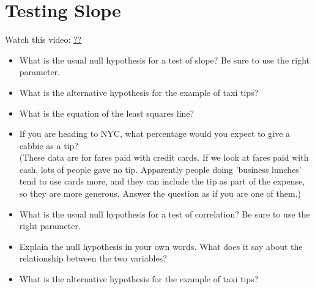 \def\theTopic{Reading 16}

\section{Testing Slope}

Watch this video:  \url{??}


\begin{itemize}
 \item What is the usual null hypothesis for a test of slope? Be sure
   to use the right parameter. \vspace{1.5cm}

 \item What is the alternative hypothesis for the example of taxi tips?\vspace{1.5cm}

 \item What is the equation of the least squares line?\vspace{1.5cm}

 \item If you are heading to NYC, what percentage would you expect to give a
   cabbie as a tip?\\
    (These data are for fares paid with credit cards. If we look at
    fares paid with cash, lots of people gave no tip. Apparently
    people doing 'business lunches' tend to use cards more, and they
    can include the tip as part of the expense, so they are more
    generous.  Answer the question as if you are one of them.) \vspace{2cm}


  \item What is the usual null hypothesis for a test of correlation? Be sure
   to use the right parameter. \vspace{2cm}
  \item Explain the null hypothesis in your own words.  What does it
    say about the relationship between the two variables?\vspace{2cm}

  \item What is the alternative hypothesis for the example of taxi tips?\vspace{2cm}

\end{itemize}
\normalsize
